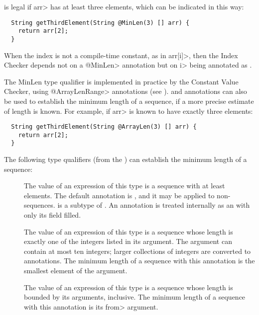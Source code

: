 \noindent
is legal if \<arr> has at least three elements, which can be indicated
in this way:

\begin{Verbatim}
  String getThirdElement(String @MinLen(3) [] arr) {
    return arr[2];
  }
\end{Verbatim}

When the index is not a compile-time constant, as in \<arr[i]>, then the
Index Checker depends not on a \<@MinLen> annotation but on \<i> being
annotated as
.

The MinLen type qualifier is implemented in practice by the Constant Value Checker,
using \<@ArrayLenRange> annotations (see ).
 and 
annotations can also be used to establish the minimum length of a sequence, if a
more precise estimate of length is known. For example,
if \<arr> is known to have exactly three elements:

\begin{Verbatim}
  String getThirdElement(String @ArrayLen(3) [] arr) {
    return arr[2];
  }
\end{Verbatim}

The following type qualifiers (from the )
can establish the minimum length of a sequence:

\begin{description}
\item[]
  The value of an expression of this type is a sequence with at least
   elements.  The default annotation is
  , and it may be applied to non-sequences.
   is a subtype of .
  An  annotation is treated internally as an
   with only its
   field filled.
\item[]
  The value of an expression of this type is a sequence whose
  length is exactly one of the integers listed in its argument.
  The argument can contain at most ten integers; larger collections of
  integers are converted to 
  annotations. The minimum length of a sequence with this annotation
  is the smallest element of the argument.
\item[]
  The value of an expression of this type is a sequence whose
  length is bounded by its arguments, inclusive.
  The minimum length of a sequence with this annotation is its \<from> argument.
\end{description}

